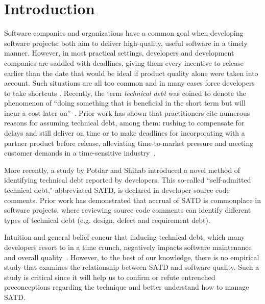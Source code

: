 
\section{Introduction}
\label{chap3:sec:introduction}
Software companies and organizations have a common goal when developing software projects: both aim to deliver high-quality, useful software in a timely manner. However, in most practical settings, developers and development companies are saddled with deadlines, giving them every incentive to release earlier than the date that would be ideal if product quality alone were taken into account. Such situations are all too common and in many cases force developers to take shortcuts \cite{kruchten2013technical} \cite{seaman2015technical}. Recently, the term \emph{technical debt} was coined to denote the phenomenon of ``doing something that is beneficial in the short term but will incur a cost later on''~\cite{cunningham1993wycash}. Prior work has shown that practitioners cite numerous reasons for assuming technical debt, among them: rushing to compensate for delays and still deliver on time or to make deadlines for incorporating with a partner product before release, alleviating time-to-market pressure and meeting customer demands in a time-sensitive industry~\cite{lim2012balancing}.


More recently, a study by Potdar and Shihab \cite{ICSM_PotdarS14} introduced a novel method of identifying technical debt reported by developers. This so-called ``self-admitted technical debt," abbreviated SATD, is declared in developer source code comments. Prior work \cite{MTD15p9} has demonstrated that accrual of SATD is commonplace in software projects, where reviewing source code comments can identify different types of technical debt (e.g. design, defect and requirement debt).

Intuition and general belief concur that inducing technical debt, which many developers resort to in a time crunch, negatively impacts software maintenance and overall quality~\cite{zazworka2011investigating,spinola2013investigating,GuoSGCTSSS11,seaman2015technical,kruchten2013technical}. However, to the best of our knowledge, there is no empirical study that examines the relationship between SATD and software quality. Such a study is critical since it will help us to confirm or refute entrenched preconceptions regarding the technique and better understand how to manage SATD.


